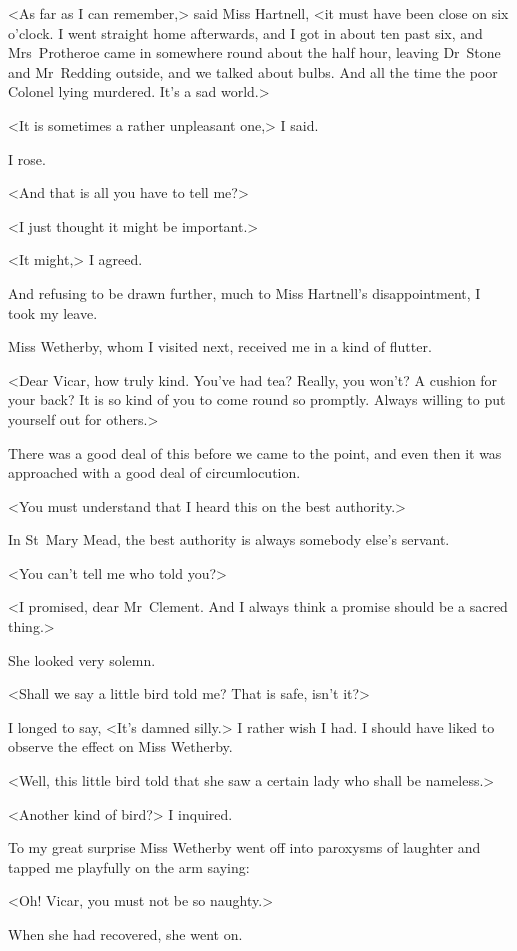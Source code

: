 <As far as I can remember,> said Miss Hartnell, <it must have been close on six o'clock. I went straight home afterwards, and I got in about ten past six, and Mrs~Protheroe came in somewhere round about the half hour, leaving Dr~Stone and Mr~Redding outside, and we talked about bulbs. And all the time the poor Colonel lying murdered. It's a sad world.>

<It is sometimes a rather unpleasant one,> I said.

I rose.

<And that is all you have to tell me?>

<I just thought it might be important.>

<It might,> I agreed.

And refusing to be drawn further, much to Miss Hartnell's disappointment, I took my leave.

Miss Wetherby, whom I visited next, received me in a kind of flutter.

<Dear Vicar, how truly kind. You've had tea? Really, you won't? A cushion for your back? It is so kind of you to come round so promptly. Always willing to put yourself out for others.>

There was a good deal of this before we came to the point, and even then it was approached with a good deal of circumlocution.

<You must understand that I heard this on the best authority.>

In St~Mary Mead, the best authority is always somebody else's servant.

<You can't tell me who told you?>

<I promised, dear Mr~Clement. And I always think a promise should be a sacred thing.>

She looked very solemn.

<Shall we say a little bird told me? That is safe, isn't it?>

I longed to say, <It's damned silly.> I rather wish I had. I should have liked to observe the effect on Miss Wetherby.

<Well, this little bird told that she saw a certain lady who shall be nameless.>

<Another kind of bird?> I inquired.

To my great surprise Miss Wetherby went off into paroxysms of laughter and tapped me playfully on the arm saying:

<Oh! Vicar, you must not be so naughty.>

When she had recovered, she went on.

